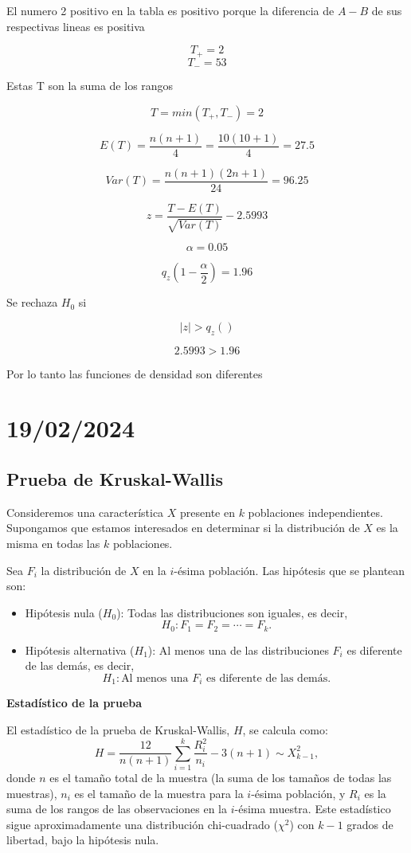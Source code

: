 \documentclass{article}
\begin{document}
El numero 2 positivo en la tabla es positivo porque la diferencia de $A - B$ de sus respectivas lineas es positiva

\[T_{+} = 2\]
\[T_{-} = 53\]

Estas T son la suma de los rangos

\[T = min(T_{+}, T_{-}) = 2\]

\[
    E(T) = \frac{n(n + 1)}{4} = \frac{10(10 + 1)}{4} = 27.5
\]

\[
    Var(T) = \frac{n(n + 1)(2n + 1)}{24} = 96.25
\]

\[
    z = \frac{T - E(T)}{\sqrt{Var(T)}} -2.5993
\]

\[\alpha = 0.05\]

\[q_z(1 - \frac{\alpha}{2}) = 1.96\]

Se rechaza $H_0$ si

\[|z| > q_z()\]

\[2.5993 > 1.96\]

Por lo tanto las funciones de densidad son diferentes

\section{19/02/2024}

\subsection{Prueba de Kruskal-Wallis}

Consideremos una característica $X$ presente en $k$ poblaciones independientes. Supongamos que estamos interesados en determinar si la distribución de $X$ es la misma en todas las $k$ poblaciones.

Sea $F_i$ la distribución de $X$ en la $i$-ésima población. Las hipótesis que se plantean son:

\begin{itemize}
    \item Hipótesis nula ($H_0$): Todas las distribuciones son iguales, es decir,
          \[ H_0: F_1 = F_2 = \cdots = F_k. \]
    \item Hipótesis alternativa ($H_1$): Al menos una de las distribuciones $F_i$ es diferente de las demás, es decir,
          \[ H_1: \text{Al menos una } F_i \text{ es diferente de las demás}. \]
\end{itemize}

\textbf{Estadístico de la prueba}

El estadístico de la prueba de Kruskal-Wallis, $H$, se calcula como:
\[ H = \frac{12}{n(n+1)} \sum_{i=1}^{k} \frac{R_i^2}{n_i} - 3(n+1) \sim X^2_{k-1}, \]
donde $n$ es el tamaño total de la muestra (la suma de los tamaños de todas las muestras), $n_i$ es el tamaño de la muestra para la $i$-ésima población, y $R_i$ es la suma de los rangos de las observaciones en la $i$-ésima muestra. Este estadístico sigue aproximadamente una distribución chi-cuadrado ($\chi^2$) con $k-1$ grados de libertad, bajo la hipótesis nula.
\end{document}
